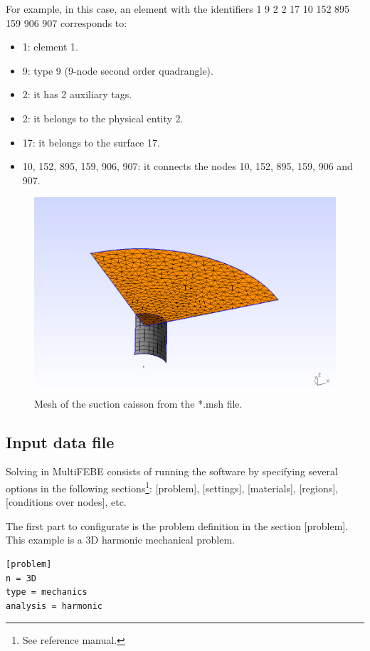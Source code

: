 \documentclass[a4]{article}
\begin{document}
For example, in this case, an element with the identifiers 1 9 2 2 17 10 152 895 159 906 907 corresponds to:

\begin{itemize}
	\item 1: element 1.
	\item 9: type 9 (9-node second order quadrangle).
	\item 2: it has 2 auxiliary tags.
	\item 2: it belongs to the physical entity 2.
	\item 17: it belongs to the surface 17.
	\item 10, 152, 895, 159, 906, 907: it connects the nodes 10, 152, 895, 159, 906 and 907.
\end{itemize} 

\begin{figure}[tbh!]
	\centering
	\includegraphics[scale=0.6]{mesh.png}
	\caption{Mesh of the suction caisson from the *.msh file.}
	\label{fig:mesh}
\end{figure}

\subsection{Input data file}
Solving in MultiFEBE consists of running the software by specifying several options in the following sections\footnote{See reference manual.}: [problem], [settings], [materials], [regions], [conditions over nodes], etc.

The first part to configurate is the problem definition in the section [problem]. This example is a 3D harmonic mechanical problem.

\begin{Verbatim}	
[problem]
n = 3D
type = mechanics
analysis = harmonic
\end{Verbatim}
\end{document}
